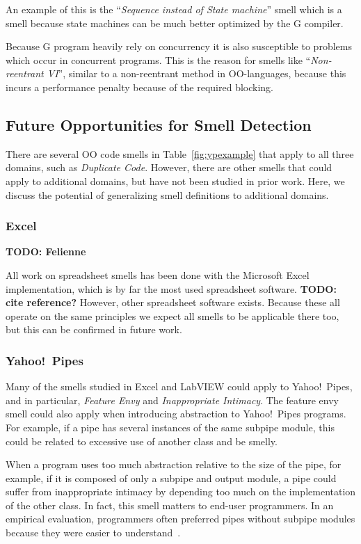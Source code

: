 \documentclass[10pt,conference,compsocconf]{IEEEtran}
\newcommand{\todo}[1]{\textbf{TODO: #1}}
\begin{document}
An example of this is the ``\textit{Sequence instead of State machine}'' smell which is a smell because state machines can be much better optimized by the G compiler.

Because G program heavily rely on concurrency it is also susceptible to problems which occur in concurrent programs.
This is the reason for smells like ``\textit{Non-reentrant VI}'', similar to a non-reentrant method in OO-languages, because this incurs a performance penalty because of the required blocking.

\subsection{Future Opportunities for Smell Detection}
\label{subsec:futuresmells}
There are several OO code smells in Table~\ref{fig:ypexample} that apply to all three domains, such as \emph{Duplicate Code}. However, there are other smells that could apply to additional domains, but have not been studied in prior work. Here, we discuss the potential of generalizing smell definitions to additional domains. 

\subsubsection{Excel} \todo{Felienne}

All work on spreadsheet smells has been done with the Microsoft Excel implementation, which is by far the most used spreadsheet software. \todo{cite reference?} However, other spreadsheet software exists. Because these all operate on the same principles we expect all smells to be applicable there too, but this can be confirmed in future work.

\subsubsection{Yahoo!\ Pipes}
Many of the smells studied in Excel and LabVIEW could apply to Yahoo!\ Pipes, and in particular, \emph{Feature Envy} and \emph{Inappropriate Intimacy}. 
The feature envy smell could also apply when introducing abstraction to Yahoo!\ Pipes programs. For example, if a pipe has several instances of the same subpipe module, this could be related to excessive use of another class and be smelly. 

When a program uses too much abstraction relative to the size of the pipe, for example, if it is composed of only a subpipe and output module, a pipe could suffer from inappropriate intimacy by depending too much on the implementation of the other class. In fact, this smell matters to end-user programmers.  In an empirical evaluation, programmers often preferred pipes without subpipe modules because they were easier to understand~\cite{StoleeTSE2013}. 
\end{document}
